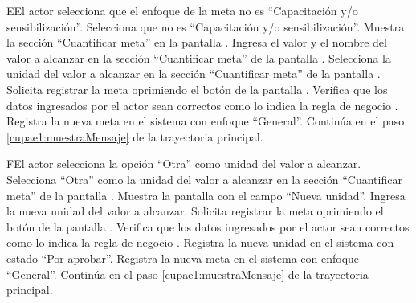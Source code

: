 \begin{UCtrayectoriaA}{E}{El actor selecciona que el enfoque de la meta no es ``Capacitación y/o sensibilización''.}
	\UCpaso[\UCactor] Selecciona que  no es ``Capacitación y/o sensibilización''. 
	\UCpaso[\UCsist] Muestra la sección ``Cuantificar meta'' en la pantalla .
	\UCpaso[\UCactor] Ingresa el valor y el nombre del valor a alcanzar en la sección ``Cuantificar meta'' de la pantalla .
	\UCpaso[\UCactor] Selecciona la unidad del valor a alcanzar en la sección ``Cuantificar meta'' de la pantalla . 
	\UCpaso[\UCactor] Solicita registrar la meta oprimiendo el botón  de la pantalla .  
	\UCpaso[\UCsist] Verifica que los datos ingresados por el actor sean correctos como lo indica la regla de negocio .   
	\UCpaso[\UCsist] Registra la nueva meta en el sistema con enfoque ``General''.
	\UCpaso[] Continúa en el paso \ref{cupae1:muestraMensaje} de la trayectoria principal.
\end{UCtrayectoriaA}

\begin{UCtrayectoriaA}{F}{El actor selecciona la opción ``Otra'' como unidad del valor a alcanzar.}
	\UCpaso[\UCactor] Selecciona ``Otra'' como la unidad del valor a alcanzar en la sección ``Cuantificar meta'' de la pantalla .
	\UCpaso[\UCsist] Muestra la pantalla   con el campo ``Nueva unidad''.
	\UCpaso[\UCactor] Ingresa la nueva unidad del valor a alcanzar.
	\UCpaso[\UCactor] Solicita registrar la meta oprimiendo el botón  de la pantalla .  
	\UCpaso[\UCsist] Verifica que los datos ingresados por el actor sean correctos como lo indica la regla de negocio .   
	\UCpaso[\UCsist] Registra la nueva unidad en el sistema con estado ``Por aprobar''.
	\UCpaso[\UCsist] Registra la nueva meta en el sistema con enfoque ``General''.
	\UCpaso[] Continúa en el paso \ref{cupae1:muestraMensaje} de la trayectoria principal.
\end{UCtrayectoriaA} 

